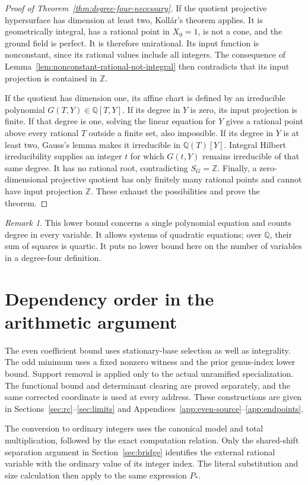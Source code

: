 \documentclass[11pt]{article}
\theoremstyle{definition}
\theoremstyle{remark}
\newtheorem{remark}[theorem]{Remark}
\newcommand{\Q}{\mathbb Q}
\newcommand{\Z}{\mathbb Z}
\begin{document}
\begin{proof}[Proof of Theorem~\ref{thm:degree-four-necessary}]
If the quotient projective hypersurface has dimension at least two,
Koll\'ar's theorem applies.  It is geometrically integral, has a
rational point in $X_0=1$, is not a cone, and the ground field is
perfect.  It is therefore unirational.  Its input function is
nonconstant, since its rational values include all integers.
The consequence of Lemma~\ref{lem:nonconstant-rational-not-integral}
then contradicts that its input projection is contained in $\Z$.

If the quotient has dimension one, its affine chart is defined by
an irreducible polynomial $G(T,Y)\in\Q[T,Y]$.  If its degree in $Y$
is zero, its input projection is finite.  If that degree is one,
solving the linear equation for $Y$ gives a rational point above
every rational $T$ outside a finite set, also impossible.
If its degree in $Y$ is at least two, Gauss's lemma makes it
irreducible in $\Q(T)[Y]$.  Integral Hilbert irreducibility supplies
an integer $t$ for which $G(t,Y)$ remains irreducible of that same
degree.  It has no rational root, contradicting $S_G=\Z$.
Finally, a zero-dimensional projective quotient has only finitely
many rational points and cannot have input projection $\Z$.
These exhaust the possibilities and prove the theorem.
\end{proof}

\begin{remark}
This lower bound concerns a single polynomial equation and counts
degree in every variable.  It allows systems of quadratic equations;
over $\Q$, their sum of squares is quartic.  It puts no lower bound
here on the number of variables in a degree-four definition.
\end{remark}


\appendix
\section{Dependency order in the arithmetic argument}\label{app:obligations}
The even coefficient bound uses stationary-base selection as well as
integrality. The odd minimum uses a fixed nonzero witness and the prior
genus-index lower bound. Support removal is applied only to the actual
unramified specialization. The functional bound and determinant clearing
are proved separately, and the same corrected coordinate is used at every
address. These constructions are given in Sections~\ref{sec:rc}--\ref{sec:limits}
and Appendices~\ref{app:even-source}--\ref{app:endpoints}.

The conversion to ordinary integers uses the canonical model and total
multiplication, followed by the exact computation relation. Only the
shared-shift separation argument in Section~\ref{sec:bridge} identifies
the external rational variable with the ordinary value of its integer
index. The literal substitution and size calculation then apply to the
same expression $P_*$.
\end{document}
